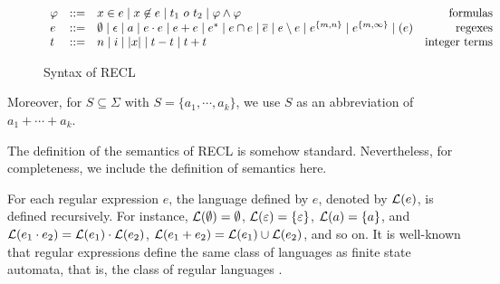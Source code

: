 \begin{figure}[h]
  \centering
$ \begin{array}{l l l r}
    \varphi & ::= & x\in e \mid x \not \in e \mid t_1\  o\ t_2 \mid  \varphi \wedge \varphi                                              & \mbox{formulas}            \\
    e &::= & \emptyset \mid \epsilon \mid a \mid e\cdot e \mid e+e \mid e^* \mid e \cap e \mid \overline{e} \mid e \setminus e \mid e^{\{m,n\}} \mid e^{\{m,\infty\}} \mid (e) & \mbox{regexes} \\
    t &::= & n \mid i \mid  |x| \mid t - t \mid t + t                                                                    & \mbox{integer terms}
    \end{array}
  $
  \caption{Syntax of RECL }\label{fig:syntax}
\end{figure}
Moreover, for $S \subseteq \Sigma$ with $S = \{a_1, \cdots, a_k\}$, we use $S$ as an abbreviation of $a_1 + \cdots + a_k$.

The definition of the semantics of RECL is somehow standard. Nevertheless, for completeness, we include the definition of semantics here. 

For each regular expression $e$, the language defined by $e$, denoted by $\mathcal{L}(e)$, is defined recursively. For instance, $\mathcal{L}(\emptyset) = \emptyset$, $\mathcal{L}(\varepsilon) = \{\varepsilon\}$, $\mathcal{L}(a) = \{a\}$, and $\mathcal{L}(e_1 \cdot e_2) = \mathcal{L}(e_1) \cdot \mathcal{L}(e_2)$, $\mathcal{L}(e_1 + e_2) = \mathcal{L}(e_1) \cup \mathcal{L}(e_2)$, and so on. 
It is well-known that regular expressions define the same class of languages as finite state automata, that is, the class of regular languages \cite{HU79}. 

